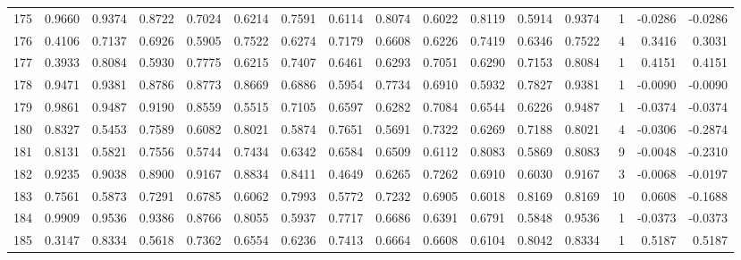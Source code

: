 \begin{tabular}{lrrrrrrrrrrrrrrr}
175 &      0.9660 &  0.9374 &  0.8722 &  0.7024 &  0.6214 &  0.7591 &  0.6114 &  0.8074 &  0.6022 &  0.8119 &   0.5914 &     0.9374 &      1 &                   -0.0286 &                    -0.0286 \\
176 &      0.4106 &  0.7137 &  0.6926 &  0.5905 &  0.7522 &  0.6274 &  0.7179 &  0.6608 &  0.6226 &  0.7419 &   0.6346 &     0.7522 &      4 &                    0.3416 &                     0.3031 \\
177 &      0.3933 &  0.8084 &  0.5930 &  0.7775 &  0.6215 &  0.7407 &  0.6461 &  0.6293 &  0.7051 &  0.6290 &   0.7153 &     0.8084 &      1 &                    0.4151 &                     0.4151 \\
178 &      0.9471 &  0.9381 &  0.8786 &  0.8773 &  0.8669 &  0.6886 &  0.5954 &  0.7734 &  0.6910 &  0.5932 &   0.7827 &     0.9381 &      1 &                   -0.0090 &                    -0.0090 \\
179 &      0.9861 &  0.9487 &  0.9190 &  0.8559 &  0.5515 &  0.7105 &  0.6597 &  0.6282 &  0.7084 &  0.6544 &   0.6226 &     0.9487 &      1 &                   -0.0374 &                    -0.0374 \\
180 &      0.8327 &  0.5453 &  0.7589 &  0.6082 &  0.8021 &  0.5874 &  0.7651 &  0.5691 &  0.7322 &  0.6269 &   0.7188 &     0.8021 &      4 &                   -0.0306 &                    -0.2874 \\
181 &      0.8131 &  0.5821 &  0.7556 &  0.5744 &  0.7434 &  0.6342 &  0.6584 &  0.6509 &  0.6112 &  0.8083 &   0.5869 &     0.8083 &      9 &                   -0.0048 &                    -0.2310 \\
182 &      0.9235 &  0.9038 &  0.8900 &  0.9167 &  0.8834 &  0.8411 &  0.4649 &  0.6265 &  0.7262 &  0.6910 &   0.6030 &     0.9167 &      3 &                   -0.0068 &                    -0.0197 \\
183 &      0.7561 &  0.5873 &  0.7291 &  0.6785 &  0.6062 &  0.7993 &  0.5772 &  0.7232 &  0.6905 &  0.6018 &   0.8169 &     0.8169 &     10 &                    0.0608 &                    -0.1688 \\
184 &      0.9909 &  0.9536 &  0.9386 &  0.8766 &  0.8055 &  0.5937 &  0.7717 &  0.6686 &  0.6391 &  0.6791 &   0.5848 &     0.9536 &      1 &                   -0.0373 &                    -0.0373 \\
185 &      0.3147 &  0.8334 &  0.5618 &  0.7362 &  0.6554 &  0.6236 &  0.7413 &  0.6664 &  0.6608 &  0.6104 &   0.8042 &     0.8334 &      1 &                    0.5187 &                     0.5187 \\

\end{tabular}
